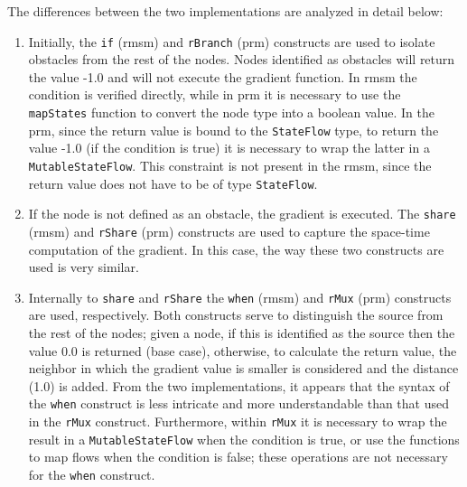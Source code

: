 



The differences between the two implementations are analyzed in detail below:

\begin{enumerate}
    \item Initially, the \texttt{if} (\ac{rmsm}) and \texttt{rBranch} (\ac{prm}) constructs are used to isolate obstacles from the rest of the nodes. Nodes identified as obstacles will return the value -1.0 and will not execute the gradient function. In \ac{rmsm} the condition is verified directly, while in \ac{prm} it is necessary to use the \texttt{mapStates} function to convert the node type into a boolean value. In the \ac{prm}, since the return value is bound to the \texttt{StateFlow} type, to return the value -1.0 (if the condition is true) it is necessary to wrap the latter in a \texttt{MutableStateFlow}. This constraint is not present in the \ac{rmsm}, since the return value does not have to be of type \texttt{StateFlow}.
    \item If the node is not defined as an obstacle, the gradient is executed. The \texttt{share} (\ac{rmsm}) and \texttt{rShare} (\ac{prm}) constructs are used to capture the space-time computation of the gradient. In this case, the way these two constructs are used is very similar.
    \item Internally to \texttt{share} and \texttt{rShare} the \texttt{when} (\ac{rmsm}) and \texttt{rMux} (\ac{prm}) constructs are used, respectively. Both constructs serve to distinguish the source from the rest of the nodes; given a node, if this is identified as the source then the value 0.0 is returned (base case), otherwise, to calculate the return value, the neighbor in which the gradient value is smaller is considered and the distance (1.0) is added. From the two implementations, it appears that the syntax of the \texttt{when} construct is less intricate and more understandable than that used in the \texttt{rMux} construct. Furthermore, within \texttt{rMux} it is necessary to wrap the result in a \texttt{MutableStateFlow} when the condition is true, or use the functions to map flows when the condition is false; these operations are not necessary for the \texttt{when} construct.
\end{enumerate}

